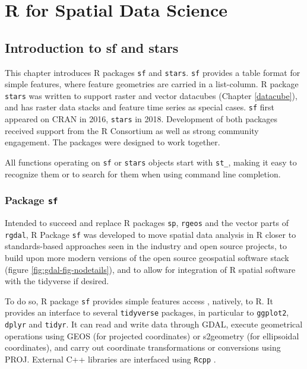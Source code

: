 \documentclass[]{book}
\begin{document}
\hypertarget{part-r-for-spatial-data-science}{%
\part{R for Spatial Data Science}\label{part-r-for-spatial-data-science}}

\hypertarget{sf}{%
\chapter{Introduction to sf and stars}\label{sf}}

This chapter introduces R packages \texttt{sf} and \texttt{stars}. \texttt{sf} provides
a table format for simple features, where feature geometries are
carried in a list-column. R package \texttt{stars} was written to support
raster and vector datacubes (Chapter \ref{datacube}), and has
raster data stacks and feature time series as special cases. \texttt{sf}
first appeared on CRAN in 2016, \texttt{stars} in 2018. Development of both
packages received support from the R Consortium as well as strong
community engagement. The packages were designed to work together.

All functions operating on \texttt{sf} or \texttt{stars} objects start with \texttt{st\_},
making it easy to recognize them or to search for them when using
command line completion.

\hypertarget{sfintro}{%
\section{\texorpdfstring{Package \texttt{sf}}{Package sf}}\label{sfintro}}

Intended to succeed and replace R packages \texttt{sp}, \texttt{rgeos} and the
vector parts of \texttt{rgdal}, R Package \texttt{sf} \citep{rjsf} was developed to
move spatial data analysis in R closer to standards-based approaches
seen in the industry and open source projects, to build upon more
modern versions of the open source geospatial software stack (figure
\ref{fig:gdal-fig-nodetails}), and to allow for integration of R
spatial software with the tidyverse if desired.

To do so, R package \texttt{sf} provides simple features access
\citep{herring2011opengis}, natively, to R. It provides an interface
to several \texttt{tidyverse} packages, in particular to \texttt{ggplot2},
\texttt{dplyr} and \texttt{tidyr}. It can read and write data through GDAL, execute
geometrical operations using GEOS (for projected coordinates)
or s2geometry (for ellipsoidal coordinates), and carry out
coordinate transformations or conversions using PROJ. External C++
libraries are interfaced using \texttt{Rcpp} \citep{eddelbuettel2013seamless}.
\end{document}
